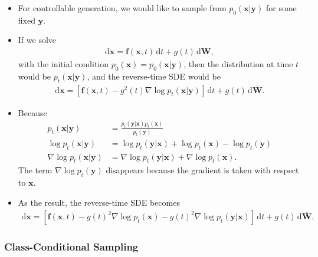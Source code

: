 \documentclass[10pt]{article}
\newcommand{\dee}{\mathrm{d}}
\newcommand{\ve}[1]{\mathbf{#1}}
\begin{document}
\begin{itemize}
  \item For controllable generation, we would like to sample from $p_0(\ve{x}|\ve{y})$ for some fixed $\ve{y}$.
  
  \item If we solve 
  \begin{align*}
    \dee\ve{x} = \ve{f}(\ve{x}, t)\, \dee t + g(t)\, \dee\ve{W},
  \end{align*}
  with the initial condition $p_0(\ve{x}) = p_0(\ve{x}|\ve{y})$, then the distribution at time $t$ would be $p_t(\ve{x}|\ve{y})$, and the reverse-time SDE would be
  \begin{align*}
    \dee\ve{x} = [\ve{f}(\ve{x}, t) - g^2(t) \nabla \log p_t(\ve{x}|\ve{y})]\, \dee t + g(t)\, \dee\overline{\ve{W}}.
  \end{align*}

  \item Because
  \begin{align*}
    p_t(\ve{x}|\ve{y}) &= \frac{p_t(\ve{y}|\ve{x}) p_t(\ve{x})}{p_t(\ve{y})} \\
    \log p_t(\ve{x}|\ve{y}) &= \log p_t(\ve{y}|\ve{x}) + \log p_t(\ve{x}) - \log p_t(\ve{y}) \\
    \nabla \log p_t(\ve{x}|\ve{y}) &= \nabla  \log p_t(\ve{y}|\ve{x}) + \nabla \log p_t(\ve{x}).
  \end{align*}
  The term $\nabla \log p_t(\ve{y})$ disappears because the gradient is taken with respect to $\ve{x}$.

  \item As the result, the reverse-time SDE becomes
  \begin{align*}
    \dee\ve{x} = [\ve{f}(\ve{x}, t) - g(t)^2 \nabla \log p_t(\ve{x}) - g(t)^2 \nabla \log p_t(\ve{y}|\ve{x})]\, \dee t + g(t)\, \dee\overline{\ve{W}}.
  \end{align*}
\end{itemize}

\subsubsection{Class-Conditional Sampling}
\end{document}
